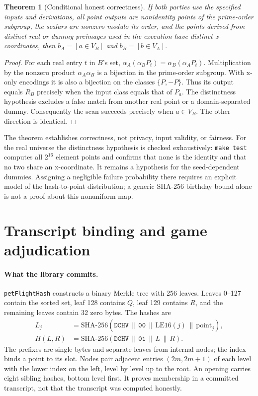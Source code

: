 \documentclass[11pt]{article}
\newtheorem{theorem}{Theorem}
\newcommand{\sha}{\mathrm{SHA\text{-}256}}
\newcommand{\concat}{\,\|\,}
\begin{document}
\begin{theorem}[Conditional honest correctness]
If both parties use the specified inputs and derivations, all point outputs
are nonidentity points of the prime-order subgroup, the scalars are nonzero
modulo its order, and the points derived from distinct real or dummy
preimages used in the execution have distinct x-coordinates, then
$b_A=[a\in V_B]$ and $b_B=[b\in V_A]$.
\end{theorem}
\begin{proof}
For each real entry $t$ in $B$'s set,
$\alpha_A(\alpha_B P_t)=\alpha_B(\alpha_A P_t)$.
Multiplication by the nonzero product $\alpha_A\alpha_B$ is a bijection in
the prime-order subgroup. With x-only encodings it is also a bijection on the
classes $\{P,-P\}$. Thus its output equals $R_B$ precisely when the input
class equals that of $P_a$. The distinctness hypothesis excludes a false
match from another real point or a domain-separated dummy. Consequently the
scan succeeds precisely when $a\in V_B$. The other direction is identical.
\end{proof}

The theorem establishes correctness, not privacy, input validity, or fairness.
For the real universe the distinctness hypothesis is checked exhaustively:
\texttt{make test} computes all $2^{16}$ element points and confirms that
none is the identity and that no two share an x-coordinate. It remains a
hypothesis for the seed-dependent dummies. Assigning a negligible failure
probability there requires an explicit model of the hash-to-point
distribution; a generic SHA-256 birthday bound alone is not a proof about
this nonuniform map.

\section{Transcript binding and game adjudication}
\label{sec:audit}

\paragraph{What the library commits.}
\texttt{petFlightHash} constructs a binary Merkle tree with 256 leaves.
Leaves 0--127 contain the sorted set, leaf 128 contains $Q$, leaf 129
contains $R$, and the remaining leaves contain 32 zero bytes. The hashes are
\begin{align*}
 L_j&=\sha(\mathtt{DCHV}\concat\mathtt{00}\concat\mathrm{LE16}(j)
                                      \concat\mathrm{point}_j),\\
 H(L,R)&=\sha(\mathtt{DCHV}\concat\mathtt{01}\concat L\concat R).
\end{align*}
The prefixes are single bytes and separate leaves from internal nodes; the
index binds a point to its slot. Nodes pair adjacent entries $(2m,2m+1)$ of
each level with the lower index on the left, level by level up to the root.
An opening carries eight sibling hashes, bottom level first. It proves membership in a
committed transcript, not that the transcript was computed honestly.
\end{document}
